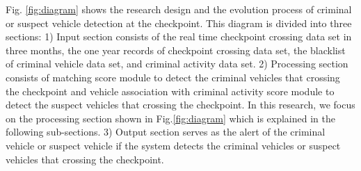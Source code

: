 \documentclass{llncs}
\begin{document}
Fig. \ref{fig:diagram} shows the research design and the evolution process of criminal or suspect vehicle detection at the checkpoint. This diagram is divided into three sections: 
1) Input section consists of the real time checkpoint crossing data set in three months, the one year records of checkpoint crossing data set, the blacklist of criminal vehicle data set, and criminal activity data set. 
2) Processing section consists of matching score module to detect the criminal vehicles that crossing the checkpoint and vehicle association with criminal activity score module to detect the suspect vehicles that crossing the checkpoint. In this research, we focus on the processing section shown in Fig.\ref{fig:diagram} which is explained in the following sub-sections. 
3) Output section serves as the alert of the criminal vehicle or suspect vehicle if the system detects the criminal vehicles or suspect vehicles that crossing the checkpoint. 
\end{document}
